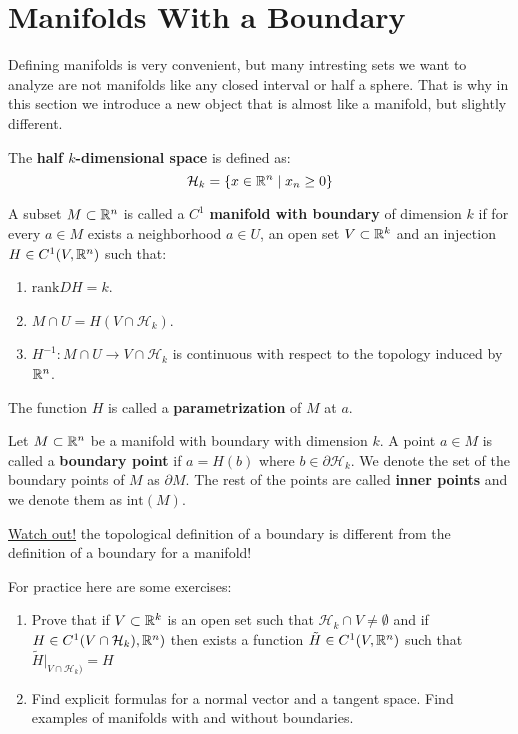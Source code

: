 \documentclass[11pt,a4paper]{article}
\begin{document}
\section{Manifolds With a Boundary}
Defining manifolds is very convenient, but many intresting sets
we want to analyze are not manifolds like any closed interval or
half a sphere. That is why in this section we introduce a new object
that is almost like a manifold, but slightly different.
\begin{definition}
  The \textbf{half $k$-dimensional space} is defined as:
  \[
    \mathcal{H}_k = \{x \in \mathbb{R}^n \mid x_n \geq 0\}
  \]
\end{definition}
\begin{definition}
  A subset $M \subset \mathbb{R}^n$ is called a $C^1$ \textbf{manifold 
  with boundary} of dimension $k$ if for every $a \in M$ exists
  a neighborhood $a \in U$, an open set $V \subset \mathbb{R}^k$ and
  an injection $H \in C^1(V, \mathbb{R}^n)$ such that:
  \begin{enumerate}
    \item $\mathrm{rank}DH = k$.
    \item $M \cap U = H(V \cap \mathcal{H}_k)$.
    \item $H^{-1} \colon M \cap U \to V \cap \mathcal{H}_k$
    is continuous with respect to the topology induced by $\mathbb{R}^n$.
  \end{enumerate}
  The function $H$ is called a \textbf{parametrization} of $M$ at
  $a$.
\end{definition}
\begin{definition}
  Let $M \subset \mathbb{R}^n$ be a manifold with boundary with dimension
  $k$. A point $a \in M$ is called a \textbf{boundary point}
  if $a = H(b)$ where $b \in \partial \mathcal{H}_k$. We denote
  the set of the boundary points of $M$ as $\partial M$. The
  rest of the points are called \textbf{inner points} and we denote
  them as $\mathrm{int}(M)$.
\end{definition}
\begin{remark}
  \underline{Watch out!} the topological definition of a boundary
  is different from the definition of a boundary for a manifold!
\end{remark}
For practice here are some exercises:
\begin{enumerate}
  \item Prove that if $V \subset \mathbb{R}^k$ is an open set such that
  $\mathcal{H}_k \cap V \neq \emptyset$ and if 
  $H \in C^1(V \cap \mathcal{H}_k), \mathbb{R}^n)$ then exists a function
  $\tilde{H} \in C^1(V, \mathbb{R}^n)$ such that 
  $\tilde{H}\vert_{V \cap \mathcal{H}_k)} = H$
  \item Find explicit formulas for a normal vector and a tangent
  space. Find examples of manifolds with and without boundaries.
\end{enumerate}
\end{document}
